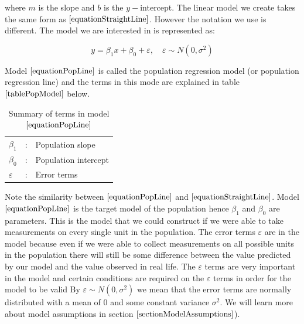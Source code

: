 where $m$ is the slope and $b$ is the $y-$intercept.
The linear model we create takes the same form as $\ref{equationStraightLine}$.
However the notation we use is different.
The model we are interested in is represented as:

\begin{skeleton}
	\begin{equation}
	\label{equationPopLine}
		y =  {\beta}_{1} x + {\beta}_{0} + \varepsilon,	
		\quad
		\varepsilon \sim N(0, \sigma^{2})
	\end{equation}
\end{skeleton}
\hfill


Model $\ref{equationPopLine}$ 
is called the population regression model
(or population regression line) 
and the terms in this mode
are explained in table $\ref{tablePopModel}$ below.

\begin{table}[H]
\label{tablePopModel}
\large
\begin{center}
	\begin{tabular}{l c l}
	$\beta_{1}$	& : &	Population slope	\\
	$\beta_{0}$	& : &	Population intercept	\\
	$\varepsilon$	& : &	Error terms
	\end{tabular}
\end{center}\vspace{-0.5cm}
\caption{Summary of terms in model $\ref{equationPopLine}$}
\end{table}
\hfill

Note the similarity between $\ref{equationPopLine}$
and  $\ref{equationStraightLine}$.
Model $\ref{equationPopLine}$ is the target model of the population
hence $\beta_{1}$ and $\beta_{0}$
are parameters.
This is the model that we could construct if we were
able to take measurements on every single unit in the population.
The error terms $\varepsilon$ are in the model
because even if we were able to collect measurements on
all possible units in the population there will still
be some difference between the value predicted by our model
and the value observed in real life.
The $\varepsilon$ terms are very important in the model
and certain conditions are required on the
$\varepsilon$ terms in order for the model to be valid
By $\varepsilon \sim N(0, \sigma^{2})$ we mean that 
the error terms are normally distributed with a mean of 0
and some constant variance $\sigma^{2}$.
We will learn more about model assumptions 
in section $\ref{sectionModelAssumptions}$).\\

